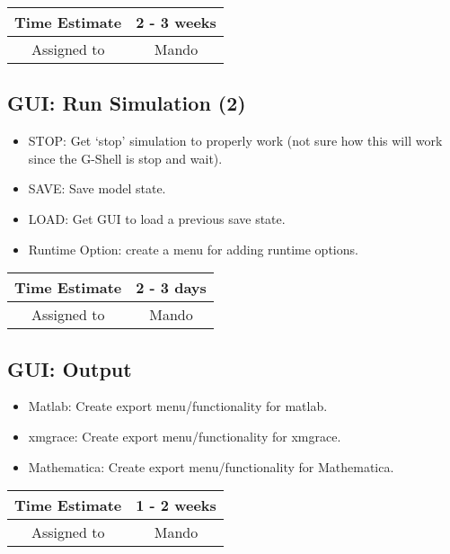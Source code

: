 \documentclass[12pt]{article}
\begin{document}
\begin{center}
  \vspace{5mm}
  \centering
  \begin{tabular}{|c|c|}
    \hline
    Time Estimate
    & 2 - 3 weeks \\
    \hline
    Assigned to
    & Mando \\
    \hline
  \end{tabular}
\end{center}


\subsection{GUI: Run Simulation (2)}
\begin{itemize}
\item STOP: Get `stop' simulation to properly work (not sure how this
  will work since the G-Shell is stop and wait).
\item SAVE: Save model state. 
\item LOAD: Get GUI to load a previous save state.
\item Runtime Option: create a menu for adding runtime options.
\end{itemize}

\begin{center}
  \vspace{5mm}
  \centering
  \begin{tabular}{|c|c|}
    \hline
    Time Estimate
    & 2 - 3 days \\
    \hline
    Assigned to
    & Mando \\
    \hline
  \end{tabular}
\end{center}


\subsection{GUI: Output}
\begin{itemize}
\item Matlab: Create export menu/functionality for matlab.
\item xmgrace: Create export menu/functionality for xmgrace.
\item Mathematica: Create export menu/functionality for Mathematica.
\end{itemize}

\begin{center}
  \vspace{5mm}
  \centering
  \begin{tabular}{|c|c|}
    \hline
    Time Estimate
    & 1 - 2 weeks \\
    \hline
    Assigned to
    & Mando \\
    \hline
  \end{tabular}
\end{center}
\end{document}
